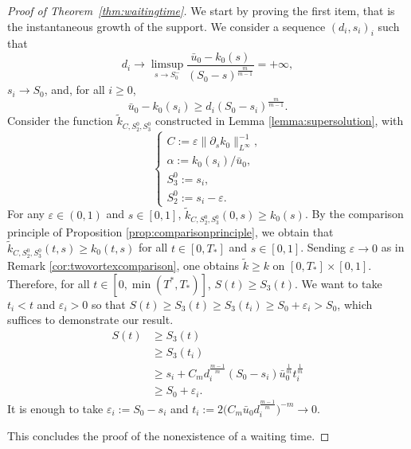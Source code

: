\documentclass[11pt]{article}
\numberwithin{equation}{section} %
\newcommand{\p}{{\partial}}
\newcommand{\ep}{\varepsilon}
\newcommand{\al}{\alpha}
\def \ep{\varepsilon}
\begin{document}
\begin{proof}[Proof of Theorem~\ref{thm:waitingtime}]
We start by proving the first item, that is the instantaneous growth of the support. We consider a sequence $(d_i,s_i)_i$ such that
    \begin{equation*}
        d_i\to \limsup_{s\to S_0^{-}} \frac{\bar u_0 - k_0(s)}{(S_0-s)^{\frac{m}{m-1}}} = +\infty,
    \end{equation*}
    $s_i\to S_0$, and, for all $i\ge 0$,
    \begin{equation*}
        \bar u_0- k_0(s_i) \ge d_i(S_0-s_i)^\frac{m}{m-1}.
    \end{equation*}
    Consider the function $\tilde k_{C,S^0_2,S^0_3}$ constructed in Lemma \ref{lemma:supersolution}, with 
    \begin{equation*}
        \begin{cases}
            C := \ep\|\p_s k_0\|_{L^\infty}^{-1}, \\
            \al := k_0(s_i)/\bar u_0, \\
            S_3^0 := s_i, \\
            S_2^0 := s_i - \ep.
        \end{cases}
    \end{equation*}
    For any $\ep \in (0,1)$ and $s\in [0,1]$, $\tilde k_{C, S_2^0, S_3^0} (0,s) \ge k_0(s)$. By the comparison principle of Proposition \ref{prop:comparisonprinciple}, we obtain that $\tilde k_{C, S_2^0, S_3^0} (t,s) \ge k_0(t,s)$ for all $t\in [0,T_*]$ and $s\in [0,1]$. Sending $\ep\to 0$ as in Remark \ref{cor:twovortexcomparison}, one obtains $\tilde k \ge k$ on $[0,T_*]\times [0,1]$. Therefore, for all $t\in [0,\min(T^*,T_*)]$, $S(t) \ge S_3(t)$. We want to take $t_i < t $ and $\ep_i>0$ so that $S(t)\ge S_3(t) \ge S_3(t_i) \ge S_0 + \ep_i >S_0$, which suffices to demonstrate our result.
    \begin{align*}
        S(t)&\ge S_3(t) \\
        &\ge S_3(t_i) \\
        &\ge s_i + C_m d_i^\frac{m-1}{m}(S_0-s_i)\bar u_0^\frac{1}{m} t^\frac{1}{m}_i \\
        &\ge S_0 + \ep_i.
    \end{align*}
    It is enough to take $\ep_i := S_0 - s_i$ and $t_i := 2\big(C_m \bar u_0 d_i^\frac{m-1}{m}\big)^{-m}\to 0$.


This concludes the proof of the nonexistence of a waiting time. 


\end{proof}
\end{document}

